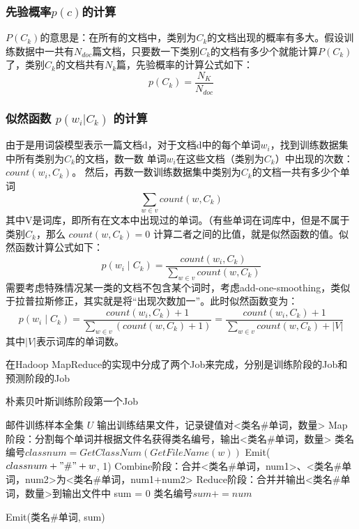 \documentclass[lang=cn,11pt]{elegantpaper}
\begin{document}
\subsubsection{先验概率$p(c)$的计算}
$P(C_k)$的意思是：在所有的文档中，类别为$C_{k}$的文档出现的概率有多大。假设训练数据中一共有$N_{doc}$篇文档，只要数一下类别$C_{k}$的文档有多少个就能计算$P(C_k)$了，类别$C_{k}$的文档共有$N_k$篇，先验概率的计算公式如下：
$$p(C_k)=\frac{N_K}{N_{doc}}$$

\subsubsection{似然函数 $p(w_i|C_k)$ 的计算}
由于是用词袋模型表示一篇文档d，对于文档d中的每个单词$w_i$，找到训练数据集中所有类别为$C_{k}$的文档，数一数 单词$w_i$在这些文档（类别为$C_{k}$）中出现的次数：$count(w_{i},C_{k})$。
然后，再数一数训练数据集中类别为$C_{k}​$的文档一共有多少个单词
$$\sum_{w \in v}count(w, C_{k})$$
其中V是词库，即所有在文本中出现过的单词。（有些单词在词库中，但是不属于类别$C_{k}$，那么 $count(w, C_{k}) = 0​$
计算二者之间的比值，就是似然函数的值。似然函数计算公式如下：
$$p(w_ {i} \mid C_ {k})=\frac{count(w_i, C_k)}{\sum_{w \in v}count(w, C_{k})}$$
需要考虑特殊情况某一类的文档不包含某个词时，考虑add-one-smoothing，类似于拉普拉斯修正，其实就是将“出现次数加一”。此时似然函数变为：
$$p(w_ {i} \mid C_ {k})=\frac{count(w_i, C_k)+1}{\sum_{w \in v}(count(w, C_{k})+1)}=\frac{count(w_i, C_k)+1}{\sum_{w \in v}count(w, C_{k})+|V|}$$
其中$|V|$表示词库的单词数。

在Hadoop MapReduce的实现中分成了两个Job来完成，分别是训练阶段的Job和预测阶段的Job
\begin{algorithm}[htb]
  \caption{朴素贝叶斯训练阶段第一个Job}
  \label{alg:Framwork}
  \begin{algorithmic}[1]
    \Require
    邮件训练样本全集 $U$
    \Ensure
    输出训练结果文件，记录键值对<类名\#单词，数量>
    \State Map阶段：分割每个单词并根据文件名获得类名编号，输出<类名\#单词，数量>
      \State 类名编号$classnum = GetClassNum(GetFileName(w))$
      \State Emit($classnum + "\#" + w$, 1)
   \EndFor
	\State Combine阶段：合并<类名\#单词，num1>、<类名\#单词，num2>为<类名\#单词，num1+num2>
    \State Reduce阶段：合并并输出<类名\#单词，数量>到输出文件中
    \State sum = 0
      \State 类名编号$sum += num$

   \EndFor
	\State Emit(类名\#单词, sum)
  \end{algorithmic}
\end{algorithm}
\end{document}
